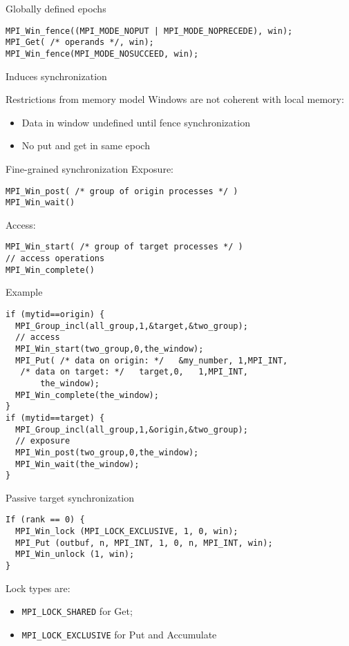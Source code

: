 \begin{frame}[fragile]{Globally defined epochs}
\begin{verbatim}
MPI_Win_fence((MPI_MODE_NOPUT | MPI_MODE_NOPRECEDE), win);
MPI_Get( /* operands */, win);
MPI_Win_fence(MPI_MODE_NOSUCCEED, win);
\end{verbatim}
Induces synchronization
\end{frame}

\begin{frame}{Restrictions from memory model}
Windows are not coherent with local memory:
\begin{itemize}
\item Data in window undefined until fence synchronization
\item No put and get in same epoch
\end{itemize}
\end{frame}

\begin{frame}[fragile]{Fine-grained synchronization}
\small
Exposure:
\begin{verbatim}
MPI_Win_post( /* group of origin processes */ )
MPI_Win_wait()
\end{verbatim}
Access:
\begin{verbatim}
MPI_Win_start( /* group of target processes */ )
// access operations
MPI_Win_complete()
\end{verbatim}
\end{frame}

\begin{frame}[fragile]{Example}
\small
\begin{verbatim}
if (mytid==origin) {
  MPI_Group_incl(all_group,1,&target,&two_group);
  // access
  MPI_Win_start(two_group,0,the_window);
  MPI_Put( /* data on origin: */   &my_number, 1,MPI_INT,
   /* data on target: */   target,0,   1,MPI_INT,
	   the_window);
  MPI_Win_complete(the_window);
}
if (mytid==target) {
  MPI_Group_incl(all_group,1,&origin,&two_group);
  // exposure
  MPI_Win_post(two_group,0,the_window);
  MPI_Win_wait(the_window);
}
\end{verbatim}
\end{frame}

\begin{frame}[fragile]{Passive target synchronization}
\begin{verbatim}
If (rank == 0) {
  MPI_Win_lock (MPI_LOCK_EXCLUSIVE, 1, 0, win);
  MPI_Put (outbuf, n, MPI_INT, 1, 0, n, MPI_INT, win);
  MPI_Win_unlock (1, win);
}
\end{verbatim}
Lock types are:
\begin{itemize}
\item \texttt{MPI_LOCK_SHARED} for Get;
\item \texttt{MPI_LOCK_EXCLUSIVE} for Put and Accumulate
\end{itemize}
\end{frame}

